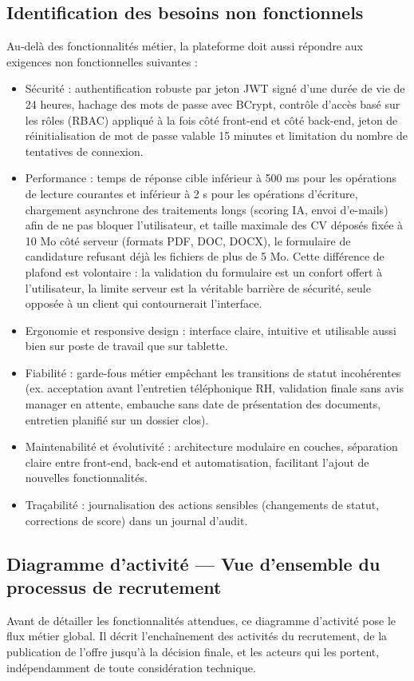 \documentclass[]{./tpl/isipfe}
\begin{document}
\subsection{Identification des besoins non fonctionnels}
\label{sec_2_2_3}
Au-delà des fonctionnalités métier, la plateforme doit aussi répondre aux exigences non fonctionnelles suivantes :

\begin{itemize}
\item Sécurité : authentification robuste par jeton JWT signé d’une durée de vie de 24 heures, hachage des mots de passe avec BCrypt, contrôle d’accès basé sur les rôles (RBAC) appliqué à la fois côté front-end et côté back-end, jeton de réinitialisation de mot de passe valable 15 minutes et limitation du nombre de tentatives de connexion.
\item Performance : temps de réponse cible inférieur à 500 ms pour les opérations de lecture courantes et inférieur à 2 s pour les opérations d’écriture, chargement asynchrone des traitements longs (scoring IA, envoi d’e-mails) afin de ne pas bloquer l’utilisateur, et taille maximale des CV déposés fixée à 10 Mo côté serveur (formats PDF, DOC, DOCX), le formulaire de candidature refusant déjà les fichiers de plus de 5 Mo. Cette différence de plafond est volontaire : la validation du formulaire est un confort offert à l’utilisateur, la limite serveur est la véritable barrière de sécurité, seule opposée à un client qui contournerait l’interface.
\item Ergonomie et responsive design : interface claire, intuitive et utilisable aussi bien sur poste de travail que sur tablette.
\item Fiabilité : garde-fous métier empêchant les transitions de statut incohérentes (ex. acceptation avant l’entretien téléphonique RH, validation finale sans avis manager en attente, embauche sans date de présentation des documents, entretien planifié sur un dossier clos).
\item Maintenabilité et évolutivité : architecture modulaire en couches, séparation claire entre front-end, back-end et automatisation, facilitant l’ajout de nouvelles fonctionnalités.
\item Traçabilité : journalisation des actions sensibles (changements de statut, corrections de score) dans un journal d’audit.
\end{itemize}

\subsection{Diagramme d’activité — Vue d’ensemble du processus de recrutement}
\label{sec_2_2_4}
Avant de détailler les fonctionnalités attendues, ce diagramme d’activité pose le flux métier global. Il décrit l’enchaînement des activités du recrutement, de la publication de l’offre jusqu’à la décision finale, et les acteurs qui les portent, indépendamment de toute considération technique.
\end{document}
